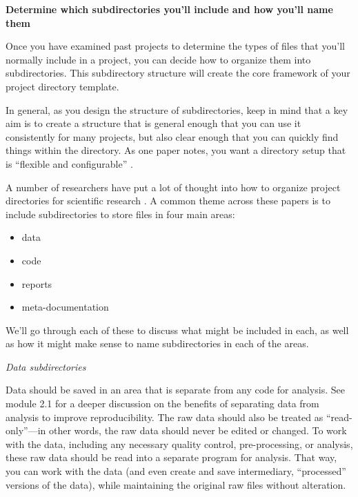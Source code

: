 \documentclass[]{tufte-book}
\providecommand{\tightlist}{%
  \setlength{\itemsep}{0pt}\setlength{\parskip}{0pt}}
\begin{document}
\textbf{Determine which subdirectories you'll include and how you'll name them}

Once you have examined past projects to determine the types of files that you'll
normally include in a project, you can decide how to organize them into
subdirectories. This subdirectory structure will create the core framework of
your project directory template.

In general, as you design the structure of subdirectories, keep in mind that a
key aim is to create a structure that is general enough that you can use it
consistently for many projects, but also clear enough that you can quickly find
things within the directory. As one paper notes, you want a directory setup that
is ``flexible and configurable'' \citep{blischak2019creating}.

A number of researchers have put a lot of thought into how to organize project
directories for scientific research \citep{vuorre2021sharing, prodigenr, blischak2019creating, marwick2018packaging, noble2009quick}. A common theme
across these papers is to include subdirectories to store files in four main
areas:

\begin{itemize}
\tightlist
\item
  data
\item
  code
\item
  reports
\item
  meta-documentation
\end{itemize}

We'll go through each of these to discuss what might be included in each, as
well as how it might make sense to name subdirectories in each of the areas.

\emph{Data subdirectories}

Data should be saved in an area that is separate from any code for analysis. See
module 2.1 for a deeper discussion on the benefits of separating data from
analysis to improve reproducibility. The raw data should also be treated as
``read-only''---in other words, the raw data should never be edited or changed. To
work with the data, including any necessary quality control, pre-processing, or
analysis, these raw data should be read into a separate program for analysis.
That way, you can work with the data (and even create and save intermediary,
``processed'' versions of the data), while maintaining the original raw files
without alteration.
\end{document}

